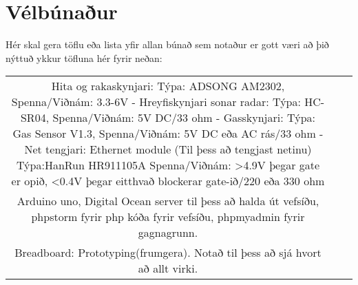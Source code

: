 \section{Vélbúnaður}
Hér skal gera töflu eða lista yfir allan búnað sem notaður er gott væri að þið nýttuð ykkur töfluna hér fyrir neðan:

\begin{center}
\begin{tabular}{ |c|c|c| } 
 \hline
 Hita og rakaskynjari: Týpa: ADSONG AM2302, Spenna/Viðnám: 3.3-6V - Hreyfiskynjari sonar radar: Týpa: HC-SR04, Spenna/Viðnám: 5V DC/33 ohm - Gasskynjari:  Týpa: Gas Sensor V1.3, Spenna/Viðnám: 5V DC eða AC rás/33 ohm - Net tengjari: Ethernet module (Til þess að tengjast netinu) Týpa:HanRun HR911105A Spenna/Viðnám: >4.9V þegar gate er opið, <0.4V þegar eitthvað blockerar gate-ið/220 eða 330 ohm  \\ 
 Arduino uno, Digital Ocean server til þess að halda út vefsíðu, phpstorm fyrir php kóða fyrir vefsíðu, phpmyadmin fyrir gagnagrunn. \\ 
 Breadboard: Prototyping(frumgera). Notað til þess að sjá hvort að allt virki. & & \\
 \hline
\end{tabular}
\end{center}
